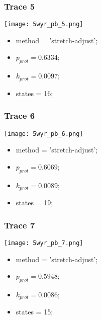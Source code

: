 \subsubsection{Trace 5}
\begin{minipage}[c]{0.7\textwidth}
    \texttt{[image: 5wyr\_pb\_5.png]}
\end{minipage}
\hfill
\begin{minipage}[c]{0.45\textwidth}
    \begin{itemize}
        \item method = 'stretch-adjust';
        \item $p_{prot}=0.6334$;
        \item $k_{prot}=0.0097$;
        \item states = 16;
    \end{itemize}
\end{minipage}

\subsubsection{Trace 6}
\begin{minipage}[c]{0.7\textwidth}
    \texttt{[image: 5wyr\_pb\_6.png]}
\end{minipage}
\hfill
\begin{minipage}[c]{0.45\textwidth}
    \begin{itemize}
        \item method = 'stretch-adjust';
        \item $p_{prot}=0.6069$;
        \item $k_{prot}=0.0089$;
        \item states = 19;
    \end{itemize}
\end{minipage}

\subsubsection{Trace 7}
\begin{minipage}[c]{0.7\textwidth}
    \texttt{[image: 5wyr\_pb\_7.png]}
\end{minipage}
\hfill
\begin{minipage}[c]{0.45\textwidth}
    \begin{itemize}
        \item method = 'stretch-adjust';
        \item $p_{prot}=0.5948$;
        \item $k_{prot}=0.0086$;
        \item states = 15;
    \end{itemize}
\end{minipage}

